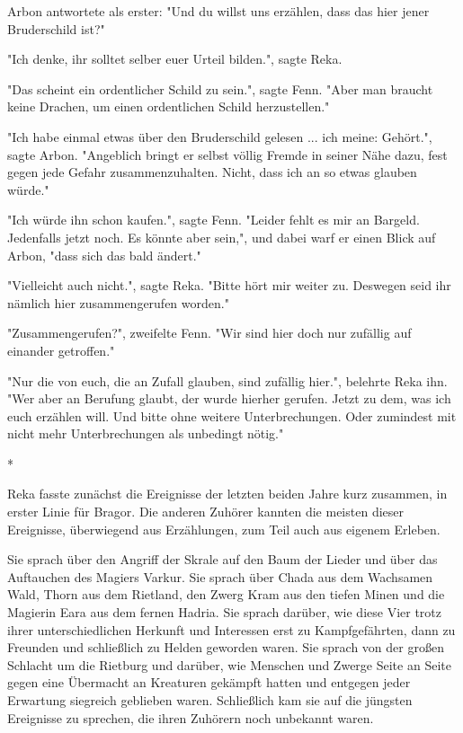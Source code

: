 \documentclass[10pt, a4paper, oneside]{book}
\begin{document}
\begin{multicols}{2}
Arbon antwortete als erster: "Und du willst uns erzählen, dass das hier jener Bruderschild ist?" 

"Ich denke, ihr solltet selber euer Urteil bilden.", sagte Reka. 

"Das scheint ein ordentlicher Schild zu sein.", sagte Fenn. "Aber man braucht keine Drachen, um einen ordentlichen Schild herzustellen." 

"Ich habe einmal etwas über den Bruderschild gelesen ... ich meine: Gehört.", sagte Arbon. "Angeblich bringt er selbst völlig Fremde in seiner Nähe dazu, fest gegen jede Gefahr zusammenzuhalten. Nicht, dass ich an so etwas glauben würde." 

"Ich würde ihn schon kaufen.", sagte Fenn. "Leider fehlt es mir an Bargeld. Jedenfalls jetzt noch. Es könnte aber sein,", und dabei warf er einen Blick auf Arbon, "dass sich das bald ändert." 

"Vielleicht auch nicht.", sagte Reka. "Bitte hört mir weiter zu. Deswegen seid ihr nämlich hier zusammengerufen worden." 

"Zusammengerufen?", zweifelte Fenn. "Wir sind hier doch nur zufällig auf einander getroffen." 

"Nur die von euch, die an Zufall glauben, sind zufällig hier.", belehrte Reka ihn. "Wer aber an Berufung glaubt, der wurde hierher gerufen. Jetzt zu dem, was ich euch erzählen will. Und bitte ohne weitere Unterbrechungen. Oder zumindest mit nicht mehr Unterbrechungen als unbedingt nötig." 

\begin{center}
    * 
\end{center}

Reka fasste zunächst die Ereignisse der letzten beiden Jahre kurz zusammen, in erster Linie für Bragor. Die anderen Zuhörer kannten die meisten dieser Ereignisse, überwiegend aus Erzählungen, zum Teil auch aus eigenem Erleben. 

Sie sprach über den Angriff der Skrale auf den Baum der Lieder und über das Auftauchen des Magiers Varkur. Sie sprach über Chada aus dem Wachsamen Wald, Thorn aus dem Rietland, den Zwerg Kram aus den tiefen Minen und die Magierin Eara aus dem fernen Hadria. Sie sprach darüber, wie diese Vier trotz ihrer unterschiedlichen Herkunft und Interessen erst zu Kampfgefährten, dann zu Freunden und schließlich zu Helden geworden waren. Sie sprach von der großen Schlacht um die Rietburg und darüber, wie Menschen und Zwerge Seite an Seite gegen eine Übermacht an Kreaturen gekämpft hatten und entgegen jeder Erwartung siegreich geblieben waren. Schließlich kam sie auf die jüngsten Ereignisse zu sprechen, die ihren Zuhörern noch unbekannt waren. 


\end{multicols}
\end{document}
